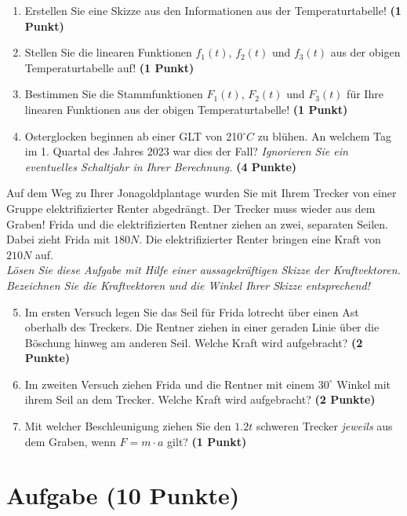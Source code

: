\documentclass[a4paper, 9pt]{scrartcl}\usepackage[]{graphicx}\usepackage[]{xcolor}
\begin{document}
\begin{enumerate}
\item Erstellen Sie eine Skizze aus den Informationen aus der
  Temperaturtabelle!  \textbf{(1 Punkt)}
\item Stellen Sie die linearen Funktionen $f_1(t)$, $f_2(t)$ und
  $f_3(t)$ aus der obigen Temperaturtabelle auf!  \textbf{(1 Punkt)}
\item Bestimmen Sie die Stammfunktionen $F_1(t)$, $F_2(t)$ und $F_3(t)$ f{\"u}r
  Ihre linearen Funktionen aus der obigen Temperaturtabelle!  \textbf{(1
    Punkt)}
\item Osterglocken beginnen ab einer GLT von 210$^\circ C$ zu bl{\"u}hen. An
  welchem Tag im 1. Quartal des Jahres 2023 war dies der
  Fall? \textit{Ignorieren Sie ein eventuelles Schaltjahr in Ihrer Berechnung.} \textbf{(4 Punkte)}
\end{enumerate}

Auf dem Weg zu Ihrer Jonagoldplantage wurden Sie mit Ihrem Trecker von
einer Gruppe elektrifizierter Renter abgedr{\"a}ngt. Der Trecker muss wieder
aus dem Graben! Frida und die elektrifizierten Rentner ziehen an zwei,
separaten Seilen. Dabei zieht Frida mit $180N$. Die
elektrifizierter Renter  bringen eine Kraft von $210N$ auf.\\

\textit{L{\"o}sen Sie diese Aufgabe mit Hilfe einer aussagekr{\"a}ftigen Skizze der
  Kraftvektoren. Bezeichnen Sie die Kraftvektoren und die Winkel Ihrer
  Skizze entsprechend!}

\begin{enumerate}
  \setcounter{enumi}{4}  
\item Im ersten Versuch legen Sie das Seil f{\"u}r Frida lotrecht {\"u}ber einen
  Ast oberhalb des Treckers. Die Rentner ziehen in einer geraden Linie {\"u}ber
  die B{\"o}schung hinweg am anderen Seil. Welche Kraft wird aufgebracht?
  \textbf{(2 Punkte)}
\item Im zweiten Versuch ziehen Frida und die Rentner mit einem
  $30^\circ$ Winkel mit ihrem Seil an dem Trecker. Welche Kraft
  wird aufgebracht? \textbf{(2 Punkte)}
\item Mit welcher Beschleunigung ziehen Sie den $1.2t$ schweren
  Trecker \textit{jeweils} aus dem Graben, wenn $F = m \cdot a$ gilt?
  \textbf{(1 Punkt)}
\end{enumerate}

 
\clearpage

\section{Aufgabe \hfill (10 Punkte)}
\end{document}
